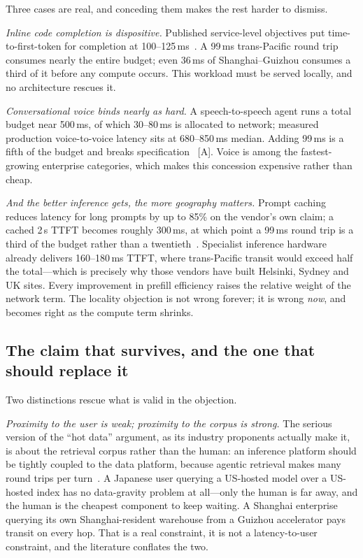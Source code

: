 Three cases are real, and conceding them makes the rest harder to dismiss.

\emph{Inline code completion is dispositive.} Published service-level objectives put time-to-first-token for completion at 100--125\,ms~\cite{distserve,ttft-budget}. A 99\,ms trans-Pacific round trip consumes nearly the entire budget; even 36\,ms of Shanghai--Guizhou consumes a third of it before any compute occurs. This workload must be served locally, and no architecture rescues it.

\emph{Conversational voice binds nearly as hard.} A speech-to-speech agent runs a total budget near 500\,ms, of which 30--80\,ms is allocated to network; measured production voice-to-voice latency sits at 680--850\,ms median. Adding 99\,ms is a fifth of the budget and breaks specification~\cite{voice-latency} [A]. Voice is among the fastest-growing enterprise categories, which makes this concession expensive rather than cheap.

\emph{And the better inference gets, the more geography matters.} Prompt caching reduces latency for long prompts by up to 85\% on the vendor's own claim; a cached 2\,s TTFT becomes roughly 300\,ms, at which point a 99\,ms round trip is a third of the budget rather than a twentieth~\cite{prompt-caching}. Specialist inference hardware already delivers 160--180\,ms TTFT, where trans-Pacific transit would exceed half the total---which is precisely why those vendors have built Helsinki, Sydney and UK sites. Every improvement in prefill efficiency raises the relative weight of the network term. The locality objection is not wrong forever; it is wrong \emph{now}, and becomes right as the compute term shrinks.

\subsection{The claim that survives, and the one that should replace it}

Two distinctions rescue what is valid in the objection.

\emph{Proximity to the user is weak; proximity to the corpus is strong.} The serious version of the ``hot data'' argument, as its industry proponents actually make it, is about the retrieval corpus rather than the human: an inference platform should be tightly coupled to the data platform, because agentic retrieval makes many round trips per turn~\cite{equinix-rag}. A Japanese user querying a US-hosted model over a US-hosted index has no data-gravity problem at all---only the human is far away, and the human is the cheapest component to keep waiting. A Shanghai enterprise querying its own Shanghai-resident warehouse from a Guizhou accelerator pays transit on every hop. That is a real constraint, it is not a latency-to-user constraint, and the literature conflates the two.

